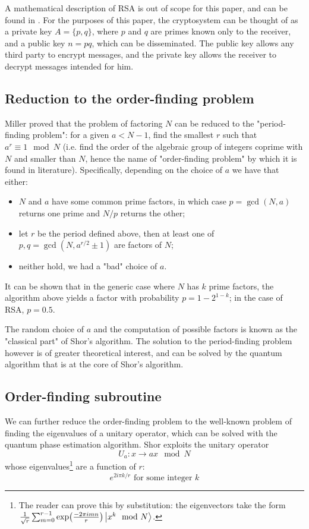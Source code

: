 \documentclass[conference]{IEEEtran}
\begin{document}
A mathematical description of RSA is out of scope for this paper, and can be found in \cite{rsa}. For the purposes of this paper, the cryptosystem can be thought of as a private key $A = \{p, q\}$, where $p$ and $q$ are primes known only to the receiver, and a public key $n=pq$, which can be disseminated. The public key allows any third party to encrypt messages, and the private key allows the receiver to decrypt messages intended for him.

\subsection{Reduction to the order-finding problem}
Miller \cite{miller} proved that the problem of factoring $N$ can be reduced to the "period-finding problem": for a given $a < N - 1$, find the smallest $r$ such that $a^r \equiv 1 \mod N$ (i.e. find the order of the algebraic group of integers coprime with $N$ and smaller than $N$, hence the name of "order-finding problem" by which it is found in literature). Specifically, depending on the choice of $a$ we have that either:
\begin{itemize}
\item $N$ and $a$ have some common prime factors, in which case $p=\gcd(N, a)$ returns one prime and $N/p$ returns the other;
\item let $r$ be the period defined above, then at least one of $p, q = \gcd(N, a^{r/2}\pm 1)$ are factors of $N$;
\item neither hold, we had a "bad" choice of $a$.
\end{itemize}

It can be shown that in the generic case where $N$ has $k$ prime factors, the algorithm above yields a factor with probability $p=1-2^{1-k}$; in the case of RSA, $p=0.5$.

The random choice of $a$ and the computation of possible factors is known as the "classical part" of Shor's algorithm. The solution to the period-finding problem however is of greater theoretical interest, and can be solved by the quantum algorithm that is at the core of Shor's algorithm.

\subsection{Order-finding subroutine}
We can further reduce the order-finding problem to the well-known problem of finding the eigenvalues of a unitary operator, which can be solved with the quantum phase estimation algorithm. Shor exploits the unitary operator
\begin{equation}
U_a: x \rightarrow ax \mod N
\end{equation}
whose eigenvalues\footnote{The reader can prove this by substitution: the eigenvectors take the form $\frac{1}{\sqrt{r}}\sum_{m=0}^{r-1}\exp(\frac{-2\pi i m n}{r})\ket{x^k \mod N}$.} are a function of $r$:
\begin{equation}
e^{2i\pi k/r}\text{ for some integer }k
\end{equation}
\end{document}
